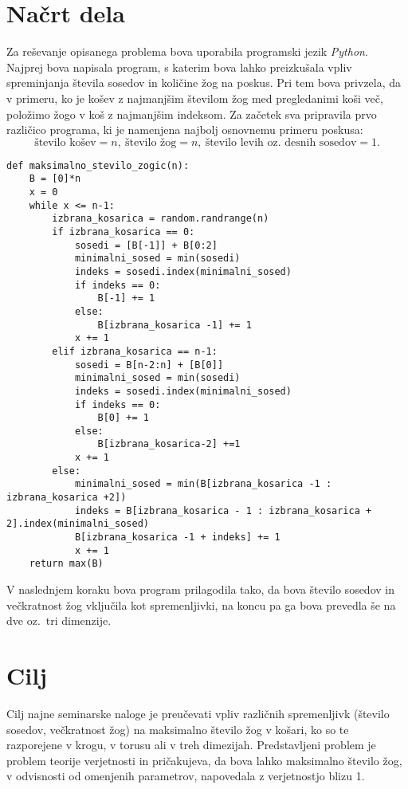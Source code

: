 \documentclass[a4paper, 11pt]{article}
\begin{document}
\section{Načrt dela}
Za reševanje opisanega problema bova uporabila programski jezik \emph{Python}. Najprej bova napisala program, s katerim bova
lahko preizkušala vpliv spreminjanja števila sosedov in količine žog na poskus. Pri tem bova privzela, da v primeru, ko je  
košev z najmanjšim številom žog med pregledanimi koši več, položimo žogo v koš z najmanjšim indeksom. Za začetek sva
pripravila prvo različico programa, ki je namenjena najbolj osnovnemu primeru poskusa:
$$ \text{število košev} = n,\  \text{število žog} = n, \ \text{število levih oz.\ desnih sosedov} = 1 .$$

\begin{verbatim}
def maksimalno_stevilo_zogic(n):
    B = [0]*n
    x = 0
    while x <= n-1:
        izbrana_kosarica = random.randrange(n)
        if izbrana_kosarica == 0:
            sosedi = [B[-1]] + B[0:2]
            minimalni_sosed = min(sosedi)
            indeks = sosedi.index(minimalni_sosed)
            if indeks == 0:
                B[-1] += 1
            else:
                B[izbrana_kosarica -1] += 1
            x += 1
        elif izbrana_kosarica == n-1:
            sosedi = B[n-2:n] + [B[0]]
            minimalni_sosed = min(sosedi)
            indeks = sosedi.index(minimalni_sosed)
            if indeks == 0:
                B[0] += 1
            else:
                B[izbrana_kosarica-2] +=1
            x += 1
        else:
            minimalni_sosed = min(B[izbrana_kosarica -1 : izbrana_kosarica +2])
            indeks = B[izbrana_kosarica - 1 : izbrana_kosarica + 2].index(minimalni_sosed)
            B[izbrana_kosarica -1 + indeks] += 1
            x += 1
    return max(B)
\end{verbatim}

\noindent V naslednjem koraku bova program prilagodila tako, da bova število sosedov in večkratnost žog vključila kot spremenljivki,
na koncu pa ga bova prevedla še na dve oz.\ tri dimenzije.

\section{Cilj}
Cilj najne seminarske naloge je preučevati vpliv različnih spremenljivk (število sosedov, večkratnost žog) na maksimalno število žog
v košari, ko so te razporejene v krogu, v torusu ali v treh dimezijah. Predstavljeni problem je problem teorije verjetnosti in pričakujeva,
da bova lahko maksimalno število žog, v odvisnosti od omenjenih parametrov, napovedala z verjetnostjo blizu 1.
\end{document}
